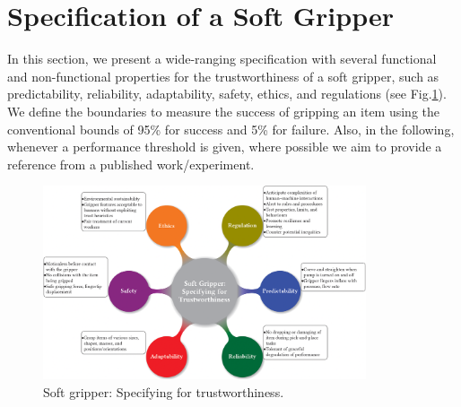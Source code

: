 \documentclass[lettersize,journal]{IEEEtran}
\begin{document}
\section{Specification of a Soft Gripper}\label{specification-gripper}
In this section, we present a wide-ranging specification with several functional and non-functional properties for the trustworthiness of a soft gripper, such as predictability, reliability, adaptability, safety, ethics, and regulations (see Fig.\ref{SR-spec}). 
We define the boundaries to measure the success of gripping an item using the conventional bounds of 95\% for success and 5\% for failure. 
Also, in the following, whenever a performance threshold is given, where possible we aim to provide a reference from a published work/experiment. 
\begin{figure}
	\centering
	\includegraphics[width=0.85\textwidth]{figures/soft-t.png}
	\caption{Soft gripper: Specifying for trustworthiness.}
	\label{SR-spec}
\end{figure}
\end{document}

